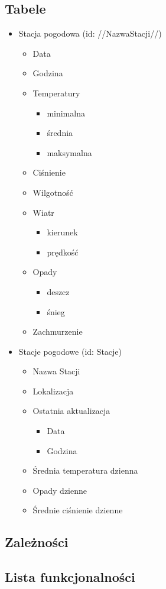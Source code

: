 \documentclass[12pt,a4paper]{article}
\begin{document}
\subsection{Tabele}
\begin{itemize}
\small
\item Stacja pogodowa (id: //NazwaStacji//)
	\begin{itemize}
	\item Data
	\item Godzina
	\item Temperatury
		\begin{itemize}
		\item minimalna
		\item średnia
		\item maksymalna
		\end{itemize}
	\item Ciśnienie
	\item Wilgotność
	\item Wiatr
		\begin{itemize}
		\item kierunek
		\item prędkość
		\end{itemize}
	\item Opady
		\begin{itemize}
		\item deszcz
		\item śnieg
		\end{itemize}
	\item Zachmurzenie
	\end{itemize}
\item Stacje pogodowe (id: Stacje)
	\begin{itemize}
	\item Nazwa Stacji
	\item Lokalizacja
	\item Ostatnia aktualizacja
		\begin{itemize}
		\item Data
		\item Godzina
		\end{itemize}
	\item Średnia temperatura dzienna
	\item Opady dzienne
	\item Średnie ciśnienie dzienne
	\end{itemize}
\end{itemize}

\subsection{Zależności}

\subsection{Lista funkcjonalności}
\end{document}
